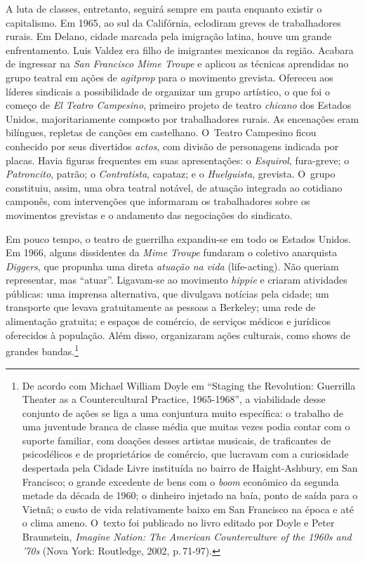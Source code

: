 
A luta de classes, entretanto, seguirá sempre em pauta enquanto existir
o capitalismo. Em 1965, ao sul da Califórnia, eclodiram greves de
trabalhadores rurais. Em Delano, cidade marcada pela imigração latina,
houve um grande enfrentamento. Luis Valdez era filho de imigrantes
mexicanos da região. Acabara de ingressar na {\it San Francisco Mime
Troupe} e aplicou as técnicas aprendidas no grupo teatral em ações de
{\it agitprop} para o movimento grevista. Ofereceu aos líderes sindicais
a possibilidade de organizar um grupo artístico, o que foi o começo de
{\it El Teatro Campesino}, primeiro projeto de teatro {\it chicano} dos
Estados Unidos, majoritariamente composto por trabalhadores rurais. As
encenações eram bilíngues, repletas de canções em castelhano. O~Teatro
Campesino ficou conhecido por seus divertidos {\it actos}, com divisão
de personagens indicada por placas. Havia figuras frequentes em suas
apresentações: o {\it Esquirol}, fura-greve; o {\it Patroncito}, patrão; o
{\it Contratista}, capataz; e o {\it Huelguista}, grevista. O~grupo
constituiu, assim, uma obra teatral notável, de atuação integrada ao
cotidiano camponês, com intervenções que informaram os trabalhadores
sobre os movimentos grevistas e o andamento das negociações do
sindicato.

Em pouco tempo, o teatro de guerrilha expandiu-se em todo os
Estados Unidos. Em 1966, alguns dissidentes da {\it Mime Troupe} fundaram o
coletivo anarquista {\it Diggers}, que propunha uma direta {\it atuação
na vida} (life-acting). Não queriam representar, mas “atuar”.
Ligavam-se ao movimento {\it hippie} e criaram atividades públicas: uma
imprensa alternativa, que divulgava notícias pela cidade; um transporte
que levava gratuitamente as pessoas a Berkeley; uma rede de alimentação
gratuita; e espaços de comércio, de serviços médicos e jurídicos
oferecidos à população. Além disso, organizaram ações culturais, como
shows de grandes bandas.\footnote{De acordo com Michael William Doyle em
  “Staging the Revolution: Guerrilla Theater as a Countercultural
  Practice, 1965-1968”, a viabilidade desse conjunto de ações se liga a
  uma conjuntura muito específica: o trabalho de uma juventude branca de
  classe média que muitas vezes podia contar com o suporte familiar, com
  doações desses artistas musicais, de traficantes de psicodélicos
  e de proprietários de comércio, que lucravam com a curiosidade
  despertada pela Cidade Livre instituída no bairro de Haight-Ashbury,
  em San Francisco; o grande excedente de bens com o {\it boom}
  econômico da segunda metade da década de 1960; o dinheiro injetado na
  baía, ponto de saída para o Vietnã; o custo de vida relativamente
  baixo em San Francisco na época e até o clima ameno. O~texto foi
  publicado no livro editado por Doyle e Peter Braunstein, {\it Imagine
  Nation: The American Counterculture of the 1960s and '70s} (Nova York:
  Routledge, 2002, p.\,71-97).}

